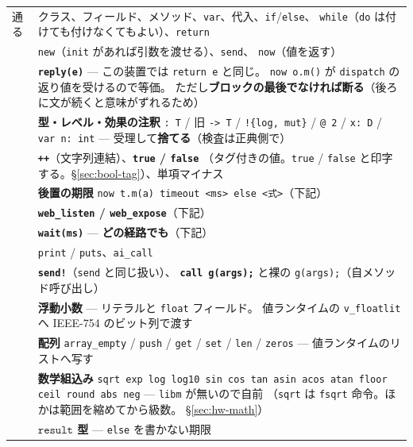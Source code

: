 \documentclass[11pt,a4paper]{ltjsarticle}
\newcommand{\ty}[1]{\ensuremath{\mathtt{#1}}}
\begin{document}
\begin{center}
\small
\begin{tabular}{@{}p{22mm}p{100mm}@{}}
\toprule
通る & クラス、フィールド、メソッド、\texttt{var}、代入、\texttt{if}/\texttt{else}、
       \texttt{while}（\texttt{do} は付けても付けなくてもよい）、\texttt{return} \\
     & \texttt{new}（\texttt{init} があれば引数を渡せる）、\texttt{send}、
       \texttt{now}（値を返す） \\
     & \textbf{\texttt{reply(e)}} --- この装置では \texttt{return e} と同じ。
       \texttt{now o.m()} が \texttt{dispatch} の返り値を受けるので等価。
       ただし\textbf{ブロックの最後でなければ断る}（後ろに文が続くと意味がずれるため） \\
     & \textbf{型・レベル・効果の注釈} \texttt{: T} / 旧 \texttt{-> T} /
       \texttt{!\{log, mut\}} / \texttt{@ 2} / \texttt{x: D} / \texttt{var n: int}
       --- 受理して\textbf{捨てる}（検査は正典側で） \\
     & \textbf{\texttt{++}}（文字列連結）、\textbf{\texttt{true} / \texttt{false}}
       （タグ付きの値。\texttt{true} / \texttt{false} と印字する。\S\ref{sec:bool-tag}）、単項マイナス \\
     & \textbf{後置の期限} \texttt{now t.m(a) timeout <ms> else <式>}（下記） \\
     & \textbf{\texttt{web\_listen} / \texttt{web\_expose}}（下記） \\
     & \textbf{\texttt{wait(ms)}} --- \textbf{どの経路でも}（下記） \\
     & \texttt{print} / \texttt{puts}、\texttt{ai\_call} \\
     & \textbf{\texttt{send!}}（\texttt{send} と同じ扱い）、
       \textbf{\texttt{call g(args);}} と裸の \texttt{g(args);}（自メソッド呼び出し） \\
     & \textbf{浮動小数} --- リテラルと \texttt{float} フィールド。
       値ランタイムの \texttt{v\_floatlit} へ IEEE-754 のビット列で渡す \\
     & \textbf{配列} \texttt{array\_empty} / \texttt{push} / \texttt{get} /
       \texttt{set} / \texttt{len} / \texttt{zeros} --- 値ランタイムのリストへ写す \\
     & \textbf{数学組込み} \texttt{sqrt exp log log10 sin cos tan asin acos atan
       floor ceil round abs neg} --- \texttt{libm} が無いので自前
       （\texttt{sqrt} は \texttt{fsqrt} 命令。ほかは範囲を縮めてから級数。
       \S\ref{sec:hw-math}） \\
     & \textbf{\ty{result} 型} --- \texttt{else} を書かない期限

\end{tabular}
\end{center}
\end{document}
